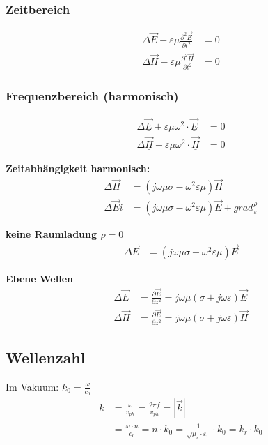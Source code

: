 \subsubsection{Zeitbereich}
\begin{align*}
    \Delta \vec{E}-\varepsilon \mu \frac{\partial^{2} \vec{E}}{\partial t^{2}} & =0 \\
    \Delta \vec{H}-\varepsilon \mu \frac{\partial^{2} \vec{H}}{\partial t^{2}} & =0
\end{align*}

\subsubsection{Frequenzbereich (harmonisch)}
\begin{align*}
    \Delta \underline{\vec{E}}+\varepsilon \mu \omega^{2} \cdot \underline{\vec{E}} & =0 \\
    \Delta \underline{\vec{H}}+\varepsilon \mu \omega^{2} \cdot \underline{\vec{H}} & =0
\end{align*}

\textbf{Zeitabhängigkeit harmonisch:}
\begin{align*}
    \Delta \vec{H}   & = (j \omega \mu \sigma - \omega^2 \varepsilon \mu ) \vec{H}                                  \\
    \Delta \vec{E} i & = (j \omega \mu \sigma - \omega^2 \varepsilon \mu ) \vec{E} + grad \frac{ \rho}{\varepsilon}
\end{align*}

\textbf{keine Raumladung $ \rho = 0$}
\begin{align*}
    \Delta \vec{E} & = (j \omega \mu \sigma - \omega^2 \varepsilon \mu ) \vec{E}
\end{align*}

\textbf{Ebene Wellen}
\begin{align*}
    \Delta \vec{E} & = \frac{ \partial \vec{E}}{ \partial z^2} = j \omega \mu ( \sigma + j \omega \varepsilon) \vec{E} \\
    \Delta \vec{H} & = \frac{ \partial \vec{E}}{ \partial z^2} = j \omega \mu ( \sigma + j \omega \varepsilon) \vec{H}
\end{align*}


\subsection{Wellenzahl}
Im Vakuum: $k_{0}=\frac{\omega}{c_{0}}$
\begin{align*}
    k & = \frac{\omega}{v_{p h}} = \frac{2 \pi f}{v_{p h}} = |\vec{k}|                                                              \\
      & = \frac{\omega \cdot n}{c_{0}} = n \cdot k_{0}=\frac{1}{\sqrt{\mu_{r} \cdot \varepsilon_{r}}} \cdot k_{0}=k_{r} \cdot k_{0}
\end{align*}

